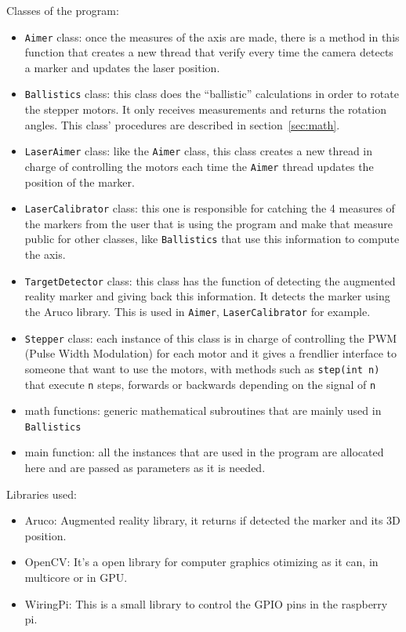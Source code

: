 \documentclass{article}
\newcommand\class[1]{\texttt{#1}}
\newcommand\method[1]{\texttt{#1}}
\begin{document}
Classes of the program:
\begin{itemize}
    \item \class{Aimer} class: once the measures of the axis are made,
there is a method in this function that creates a new thread that verify
every time the camera detects a marker and updates the laser position.
    \item \class{Ballistics} class: this class does the ``ballistic'' calculations
in order to rotate the stepper motors. It only receives measurements
and returns the rotation angles.
This class' procedures are described in section~\ref{sec:math}.
    \item \class{LaserAimer} class: like the \class{Aimer} class, this class
creates a new thread in charge of controlling the motors each time the 
\class{Aimer} thread updates the position of the marker.
    \item \class{LaserCalibrator} class: this one is responsible for catching
the 4 measures of the markers from the user that is using the program and make
that measure public for other classes, like \class{Ballistics} that use this
information to compute the axis.
    \item \class{TargetDetector} class: this class has the function of
detecting the augmented reality marker and giving back this information.
It detects the marker using the Aruco library.
This is used in \class{Aimer}, \class{LaserCalibrator} for example.
    \item \class{Stepper} class: each instance of this class is in charge of
controlling the PWM (Pulse Width Modulation) for each motor and it
gives a frendlier interface to someone that want to use the motors,
with methods such as \method{step(int n)} that execute \texttt{n} steps,
forwards or backwards depending on the signal of \texttt{n}
    \item math functions: generic mathematical subroutines that are mainly used in
\class{Ballistics} 
    \item main function: all the instances that are used in the program are
allocated here and are passed as parameters as it is needed. 
\end{itemize}

Libraries used:
\begin{itemize}
    \item Aruco: Augmented reality library, it returns if detected the marker
and its 3D position.
    \item OpenCV: It's a open library for computer graphics otimizing as it can,
in multicore or in GPU. 
    \item WiringPi: This is a small library to control the GPIO pins in the
raspberry pi.
\end{itemize}
\end{document}
